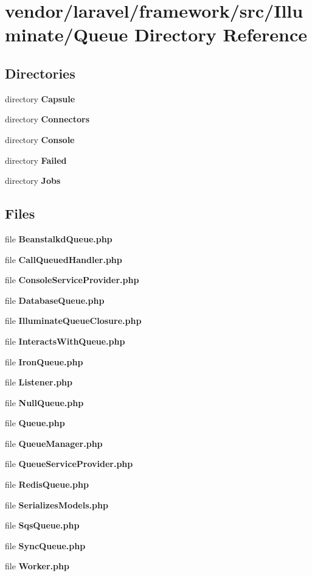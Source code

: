 \section{vendor/laravel/framework/src/\+Illuminate/\+Queue Directory Reference}
\label{dir_16c3e529c4706cc649812204625141c7}
\subsection*{Directories}
\begin{DoxyCompactItemize}
\item 
directory {\bf Capsule}
\item 
directory {\bf Connectors}
\item 
directory {\bf Console}
\item 
directory {\bf Failed}
\item 
directory {\bf Jobs}
\end{DoxyCompactItemize}
\subsection*{Files}
\begin{DoxyCompactItemize}
\item 
file {\bf Beanstalkd\+Queue.\+php}
\item 
file {\bf Call\+Queued\+Handler.\+php}
\item 
file {\bf Console\+Service\+Provider.\+php}
\item 
file {\bf Database\+Queue.\+php}
\item 
file {\bf Illuminate\+Queue\+Closure.\+php}
\item 
file {\bf Interacts\+With\+Queue.\+php}
\item 
file {\bf Iron\+Queue.\+php}
\item 
file {\bf Listener.\+php}
\item 
file {\bf Null\+Queue.\+php}
\item 
file {\bf Queue.\+php}
\item 
file {\bf Queue\+Manager.\+php}
\item 
file {\bf Queue\+Service\+Provider.\+php}
\item 
file {\bf Redis\+Queue.\+php}
\item 
file {\bf Serializes\+Models.\+php}
\item 
file {\bf Sqs\+Queue.\+php}
\item 
file {\bf Sync\+Queue.\+php}
\item 
file {\bf Worker.\+php}
\end{DoxyCompactItemize}
